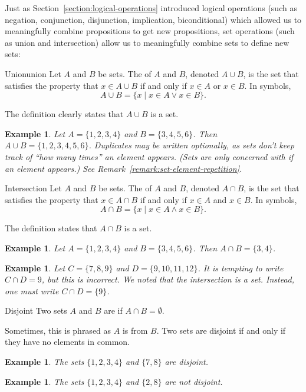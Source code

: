 \documentclass{book}
\newcounter{ekcounter}%
\theoremstyle{ekimcustom}
\newtheorem{example}[ekcounter]{Example}
\newcommand\defn[1]{{\color{blue}{\bf #1}}}
\begin{document}
Just as Section~\ref{section:logical-operations} introduced logical operations (such as negation, conjunction, disjunction, implication, biconditional) which allowed us to meaningfully combine propositions to get new propositions, set operations (such as union and intersection) allow us to meaningfully combine sets to define new sets:
\begin{bdefinition}{Union}{union}
Let $A$ and $B$ be sets. The \defn{union} of $A$ and $B$, denoted $A \cup B$, is the set that satisfies the property that $x \in A \cup B$ if and only if $x \in A$ or $x \in B$. In symbols,
\[ A \cup B = \{ x \mid x \in A \vee x \in B\}.\]
\end{bdefinition}
The definition clearly states that $A \cup B$ is a set.
\begin{example}
Let $A = \{1,2,3,4\}$ and $B=\{3,4,5,6\}$. Then $A \cup B = \{1,2,3,4,5,6\}$. Duplicates may be written optionally, as sets don't keep track of ``how many times'' an element appears. (Sets are only concerned with \emph{if} an element appears.) See Remark~\ref{remark:set-element-repetition}.
\end{example}

\begin{bdefinition}{Intersection}{}
Let $A$ and $B$ be sets. The \defn{intersection} of $A$ and $B$, denoted $A \cap B$, is the set that satisfies the property that $x \in A \cap B$ if and only if $x \in A$ and $x \in B$. In symbols,
\[ A \cap B = \{ x \mid x \in A \wedge x \in B\}.\]
\end{bdefinition}
The definition states that $A \cap B$ is a set.
\begin{example}
Let $A = \{1,2,3,4\}$ and $B=\{3,4,5,6\}$. Then $A \cap B = \{3,4\}$.
\end{example}
\begin{example}
Let $C = \{7,8,9\}$ and $D=\{9,10,11,12\}$. It is tempting to write $C \cap D =9$, but this is incorrect. We noted that the intersection is a set. Instead, one must write $C \cap D = \{9\}$.
\end{example}

\begin{bdefinition}{Disjoint}{}
Two sets $A$ and $B$ are \defn{disjoint} if $A \cap B = \emptyset$.
\end{bdefinition}
Sometimes, this is phrased as $A$ is \defn{disjoint} from $B$. Two sets are disjoint if and only if they have no elements in common.
\begin{example}
The sets $\{1,2,3,4\}$ and $\{7,8\}$ are disjoint.
\end{example}
\begin{example}
The sets $\{1,2,3,4\}$ and $\{2,8\}$ are not disjoint.
\end{example}
\end{document}
